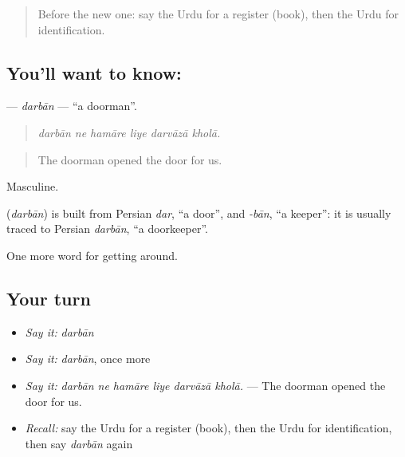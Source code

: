 \label{lesson:UR-C405-darban}



\begin{quote}
Before the new one: say the Urdu for a register (book), then the Urdu for identification.
\end{quote}

\subsection*{You'll want to know: }
\textbf{} — \emph{darbān} — \textquotedblleft{}a doorman\textquotedblright{}.

\begin{quote}
     
\end{quote}

\begin{quote}
\emph{darbān ne hamāre liye darvāzā kholā.}
\end{quote}

\begin{quote}
The doorman opened the door for us.
\end{quote}

Masculine.

\begin{cousinweb}
\textbf{} (\emph{darbān}) is built from Persian \emph{dar}, \textquotedblleft{}a door\textquotedblright{}, and \emph{-bān}, \textquotedblleft{}a keeper\textquotedblright{}: it is usually traced to Persian \emph{darbān}, \textquotedblleft{}a doorkeeper\textquotedblright{}.
\end{cousinweb}

\begin{grammarlens}[title={What you've built}]
One more word for getting around.
\end{grammarlens}

\subsection*{Your turn}
\begin{itemize}
\raggedright
  \item \emph{Say it:} \emph{darbān}
  \item \emph{Say it:} \emph{darbān}, once more
  \item \emph{Say it:} \emph{darbān ne hamāre liye darvāzā kholā.} — The doorman opened the door for us.
  \item \emph{Recall:} say the Urdu for a register (book), then the Urdu for identification, then say \emph{darbān} again
\end{itemize}

